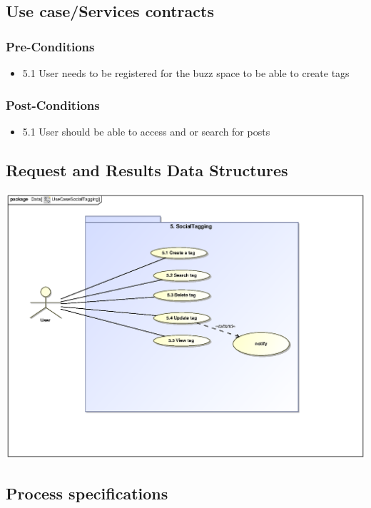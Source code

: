 \documentclass[hidelinks, 12pt, oneside]{article}
\begin{document}
\subsection{Use case/Services contracts}
\subsubsection{Pre-Conditions}								%
\begin{itemize}
  \item 5.1 User needs to be registered for the buzz space to be able to create tags
\end{itemize}

\subsubsection{Post-Conditions}%
\begin{itemize}
  \item 5.1 User should be able to access and or search for posts
\end{itemize}

\subsection{Request and Results Data Structures} 
\includegraphics[scale=.9]{Semaka/graphics/useCaseSocialTagging.eps}\\

\subsection{Process specifications}
\end{document}
